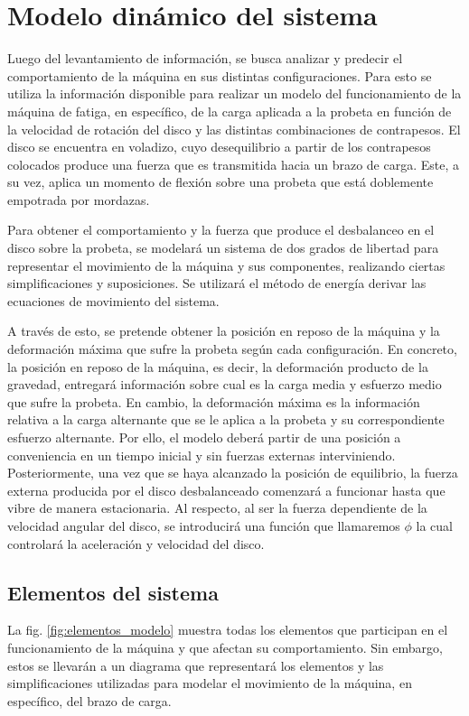 \section{Modelo dinámico del sistema}
Luego del levantamiento de información, se busca analizar y predecir el comportamiento de la máquina en sus distintas configuraciones. Para esto se utiliza la información disponible para realizar un modelo del funcionamiento de la máquina de fatiga, en específico, de la carga aplicada a la probeta en función de la velocidad de rotación del disco y las distintas combinaciones de contrapesos. El disco se encuentra en voladizo, cuyo desequilibrio a partir de los contrapesos colocados produce una fuerza que es transmitida hacia un brazo de carga. Este, a su vez, aplica un momento de flexión sobre una probeta que está doblemente empotrada por mordazas.

Para obtener el comportamiento y la fuerza que produce el desbalanceo en el disco sobre la probeta, se modelará un sistema de dos grados de libertad para representar el movimiento de la máquina y sus componentes, realizando ciertas simplificaciones y suposiciones. Se utilizará el método de energía derivar las ecuaciones de movimiento del sistema.

A través de esto, se pretende obtener la posición en reposo de la máquina y la deformación máxima que sufre la probeta según cada configuración. En concreto, la posición en reposo de la máquina, es decir, la deformación producto de la gravedad, entregará información sobre cual es la carga media y esfuerzo medio que sufre la probeta. En cambio, la deformación máxima es la información relativa a la carga alternante que se le aplica a la probeta y su correspondiente esfuerzo alternante. Por ello, el modelo deberá partir de una posición a conveniencia en un tiempo inicial y sin fuerzas externas interviniendo. Posteriormente, una vez que se haya alcanzado la posición de equilibrio, la fuerza externa producida por el disco desbalanceado comenzará a funcionar hasta que vibre de manera estacionaria. Al respecto, al ser la fuerza dependiente de la velocidad angular del disco, se introducirá una función que llamaremos $\phi$ la cual controlará la aceleración y velocidad del disco.

\subsection{Elementos del sistema}
La fig. \ref{fig:elementos_modelo} muestra todas los elementos que participan en el funcionamiento de la máquina y que afectan su comportamiento. Sin embargo, estos se llevarán a un diagrama que representará los elementos y las simplificaciones utilizadas para modelar el movimiento de la máquina, en específico, del brazo de carga.  

